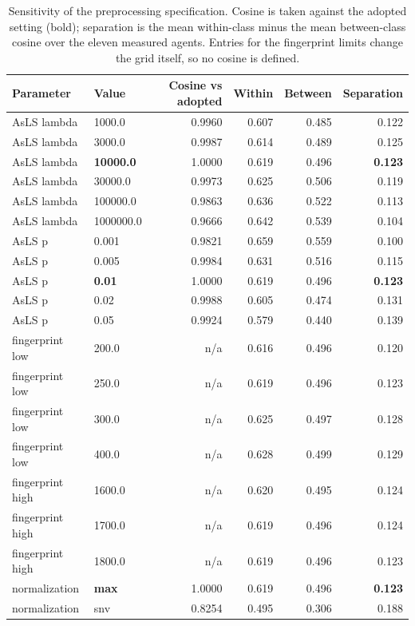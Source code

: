 \begin{table}[htbp]
\centering
\caption{Sensitivity of the preprocessing specification. Cosine is taken against the adopted setting (bold); separation is the mean within-class minus the mean between-class cosine over the eleven measured agents. Entries for the fingerprint limits change the grid itself, so no cosine is defined.}
\label{tab:si-preproc}
\small
\begin{tabular}{llrrrr}
\toprule
Parameter & Value & Cosine vs adopted & Within & Between & Separation \\
\midrule
AsLS lambda & 1000.0 & 0.9960 & 0.607 & 0.485 & 0.122 \\
AsLS lambda & 3000.0 & 0.9987 & 0.614 & 0.489 & 0.125 \\
AsLS lambda & \textbf{10000.0} & 1.0000 & 0.619 & 0.496 & \textbf{0.123} \\
AsLS lambda & 30000.0 & 0.9973 & 0.625 & 0.506 & 0.119 \\
AsLS lambda & 100000.0 & 0.9863 & 0.636 & 0.522 & 0.113 \\
AsLS lambda & 1000000.0 & 0.9666 & 0.642 & 0.539 & 0.104 \\
AsLS p & 0.001 & 0.9821 & 0.659 & 0.559 & 0.100 \\
AsLS p & 0.005 & 0.9984 & 0.631 & 0.516 & 0.115 \\
AsLS p & \textbf{0.01} & 1.0000 & 0.619 & 0.496 & \textbf{0.123} \\
AsLS p & 0.02 & 0.9988 & 0.605 & 0.474 & 0.131 \\
AsLS p & 0.05 & 0.9924 & 0.579 & 0.440 & 0.139 \\
fingerprint low & 200.0 & n/a & 0.616 & 0.496 & 0.120 \\
fingerprint low & 250.0 & n/a & 0.619 & 0.496 & 0.123 \\
fingerprint low & 300.0 & n/a & 0.625 & 0.497 & 0.128 \\
fingerprint low & 400.0 & n/a & 0.628 & 0.499 & 0.129 \\
fingerprint high & 1600.0 & n/a & 0.620 & 0.495 & 0.124 \\
fingerprint high & 1700.0 & n/a & 0.619 & 0.496 & 0.124 \\
fingerprint high & 1800.0 & n/a & 0.619 & 0.496 & 0.123 \\
normalization & \textbf{max} & 1.0000 & 0.619 & 0.496 & \textbf{0.123} \\
normalization & snv & 0.8254 & 0.495 & 0.306 & 0.188 \\
\bottomrule
\end{tabular}


\end{table}
